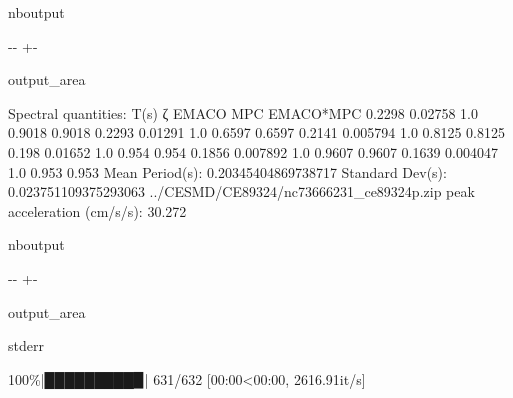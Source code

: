 \documentclass[letterpaper,10pt,english]{sphinxmanual}
\begin{document}
\begin{sphinxuseclass}{nboutput}
{

\kern-\sphinxverbatimsmallskipamount\kern-\baselineskip
\kern+\FrameHeightAdjust\kern-\fboxrule
\vspace{\nbsphinxcodecellspacing}

\begin{sphinxuseclass}{output_area}
\begin{sphinxuseclass}{}


\begin{sphinxVerbatim}[commandchars=\\\{\}]
Spectral quantities:
       T(s)        ζ        EMACO        MPC     EMACO*MPC
      0.2298     0.02758    1.0        0.9018     0.9018
      0.2293     0.01291    1.0        0.6597     0.6597
      0.2141     0.005794   1.0        0.8125     0.8125
      0.198      0.01652    1.0        0.954      0.954
      0.1856     0.007892   1.0        0.9607     0.9607
      0.1639     0.004047   1.0        0.953      0.953
Mean Period(s): 0.20345404869738717
Standard Dev(s): 0.023751109375293063
../CESMD/CE89324/nc73666231\_ce89324p.zip
peak acceleration (cm/s/s): 30.272
\end{sphinxVerbatim}



\end{sphinxuseclass}
\end{sphinxuseclass}
}

\end{sphinxuseclass}
\begin{sphinxuseclass}{nboutput}
{

\kern-\sphinxverbatimsmallskipamount\kern-\baselineskip
\kern+\FrameHeightAdjust\kern-\fboxrule
\vspace{\nbsphinxcodecellspacing}

\begin{sphinxuseclass}{output_area}
\begin{sphinxuseclass}{stderr}


\begin{sphinxVerbatim}[commandchars=\\\{\}]
100\%|█████████▉| 631/632 [00:00<00:00, 2616.91it/s]
\end{sphinxVerbatim}



\end{sphinxuseclass}
\end{sphinxuseclass}
}

\end{sphinxuseclass}
\end{document}
